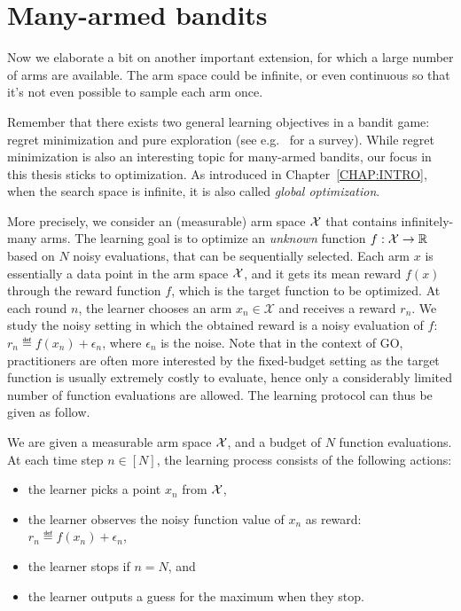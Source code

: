 \section{Many-armed bandits}\label{sec:mab.continuum}

Now we elaborate a bit on another important extension, for which a large number of arms are available. The arm space could be infinite, or even continuous so that it's not even possible to sample each arm once.

Remember that there exists two general learning objectives in a bandit game: regret minimization and pure exploration (see e.g.~\citealt{kaufmann2017survey} for a survey). While regret minimization is also an interesting topic for many-armed bandits, our focus in this thesis sticks to optimization. As introduced in Chapter~\ref{CHAP:INTRO}, when the search space is infinite, it is also called \emph{global optimization}.

More precisely, we consider an (measurable) arm space $\mathcal{X}$ that contains infinitely-many arms. The learning goal is to optimize an \emph{unknown} function $f: \mathcal{X} \rightarrow \mathbb{R}$ based on $N$ noisy evaluations, that can be sequentially selected. Each arm $x$ is essentially a data point in the arm space $\mathcal{X}$, and it gets its mean reward $f(x)$ through the reward function $f$, which is the target function to be optimized. At each round $n$, the learner chooses an arm $x_n \in \mathcal{X}$ and receives a reward $r_n$. We study the noisy setting in which the obtained reward is a noisy evaluation of $f$: $r_n \eqdef f(x_n) + \epsilon_n$, where $\epsilon_n$ is the noise. Note that in the context of GO, practitioners are often more interested by the fixed-budget setting as the target function is usually extremely costly to evaluate, hence only a considerably limited number of function evaluations are allowed. The learning protocol can thus be given as follow.

\begin{definition}\label{def:mab.go}
\begin{leftbar}[defnbar]
	We are given a measurable arm space $\mathcal{X}$, and a budget of $N$ function evaluations. At each time step $n\in[N]$, the learning process consists of the following actions:
\begin{itemize}
	\item the learner picks a point $x_n$ from $\mathcal{X}$,
	\item the learner observes the noisy function value of $x_n$ as reward: $r_n \eqdef f(x_n) + \epsilon_n$,
	\item the learner stops if $n=N$, and
	\item the learner outputs a guess for the maximum when they stop.
\end{itemize}
\end{leftbar}
\end{definition}

